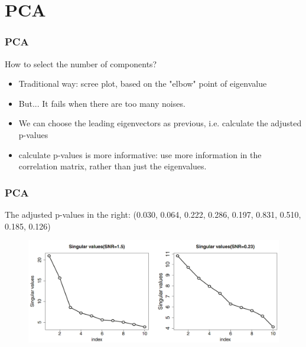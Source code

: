 \documentclass{beamer}
\begin{document}
\section{PCA}
\begin{frame}
\frametitle{PCA}
How to select the number of components?
\begin{itemize}
	\item
	Traditional way: scree plot, based on the "elbow" point of eigenvalue
	\item
	But... It fails when there are too many noises.
	\item
	We can choose the leading eigenvectors as previous, i.e. calculate the adjusted p-values 
	\item
	calculate p-values is more informative: use more information in the correlation matrix, rather than just the eigenvalues. 
\end{itemize}
\end{frame}

\begin{frame}
\frametitle{PCA}
The adjusted p-values in the right: (0.030, 0.064, 0.222, 0.286, 0.197, 0.831, 0.510, 0.185, 0.126)
\begin{figure}
	\includegraphics[width=0.8\linewidth]{pca.png}
\end{figure}
\end{frame}
\end{document}
